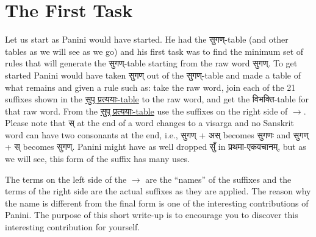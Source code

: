 \documentclass[leqno,fleqn,12pt]{article}%
\begin{document}
\section{The First Task}
Let us start as Panini would have started. He had the सुगण्-table (and other tables as we will see as we go) and his first task was to find the minimum set of rules that will generate the सुगण्-table starting from the raw word सुगण्.  To get started Panini would have taken सुगण् out of the सुगण्-table and made a table of what remains and given a rule such as: take the raw word, join each of the 21 suffixes shown in the \hyperlink{सुप् प्रत्ययाः}{सुप् प्रत्ययाः-table} to the raw word, and get the विभक्ति-table for that raw word. From the \hyperlink{सुप् प्रत्ययाः}{सुप् प्रत्ययाः-table} use the suffixes on the right side of $\rightarrow$. Please note that स् at the end of a word changes to a visarga and no Sanskrit word can have two consonants at the end, i.e., सुगण् + अस् becomes सुगणः and सुगण् + स् becomes सुगण्. Panini might have as well dropped सुँ in प्रथमा-एकवचानम्, but as we will see, this form of the suffix has many uses.

The terms on the left side of the $\rightarrow$ are the ``names'' of the suffixes and the terms of the right side are the actual suffixes as they are applied. The reason why the name is different from the final form is one of the interesting contributions of Panini. The purpose of this short write-up is to encourage you to discover this interesting contribution for yourself. 
\end{document}
